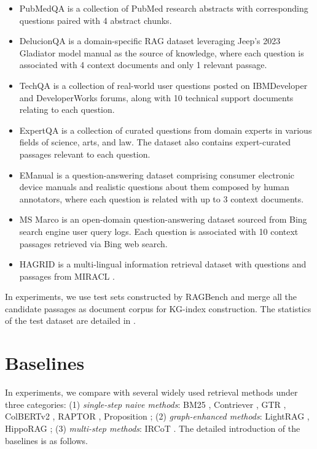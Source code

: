 \begin{itemize}
    \item PubMedQA \cite{jin-etal-2019-pubmedqa} is a collection of PubMed research abstracts with corresponding questions paired with 4 abstract chunks.
    \item  DelucionQA \cite{sadat-etal-2023-delucionqa} is a domain-specific RAG dataset leveraging Jeep’s 2023 Gladiator model manual as the source of knowledge, where each question is associated with 4 context documents and only 1 relevant passage.
    \item TechQA \cite{castelli-etal-2020-techqa} is a collection of real-world user questions posted on IBMDeveloper and DeveloperWorks forums, along with 10 technical support documents relating to each question.
    \item ExpertQA \cite{malaviya2023expertqa} is a collection of curated questions from domain experts in various fields of science, arts, and law. The dataset also contains expert-curated passages relevant to each question.
    \item EManual \cite{nandy-etal-2021-question-answering} is a question-answering dataset comprising consumer electronic device manuals and realistic questions about them composed by human annotators, where each question is related with up to 3 context documents.
     \item MS Marco \cite{nguyen2016ms} is an open-domain question-answering dataset sourced from Bing search engine user query logs. Each question is associated with 10 context passages retrieved via Bing web search.
    \item HAGRID \cite{kamalloo2023hagrid} is a multi-lingual information retrieval dataset with questions and passages from MIRACL \cite{zhang2022making}.
\end{itemize}
In experiments, we use test sets constructed by RAGBench \cite{friel2024ragbench} and merge all the candidate passages as document corpus for KG-index construction. The statistics of the test dataset are detailed in .



\section{Baselines}\label{app:baselines}
In experiments, we compare with several widely used retrieval methods under three categories: (1) \emph{single-step naive methods}: BM25 \cite{robertson1994some}, Contriever \cite{izacardunsupervised}, GTR \cite{ni2022large}, ColBERTv2 \cite{santhanam2022colbertv2}, RAPTOR \cite{sarthiraptor}, Proposition \cite{chen-etal-2024-dense}; (2) \emph{graph-enhanced methods}: LightRAG \cite{guo2024lightrag}, HippoRAG \cite{gutiérrez2024hipporag}; (3) \emph{multi-step methods}: IRCoT \cite{trivedi2023interleaving}. The detailed introduction of the baselines is as follows.

